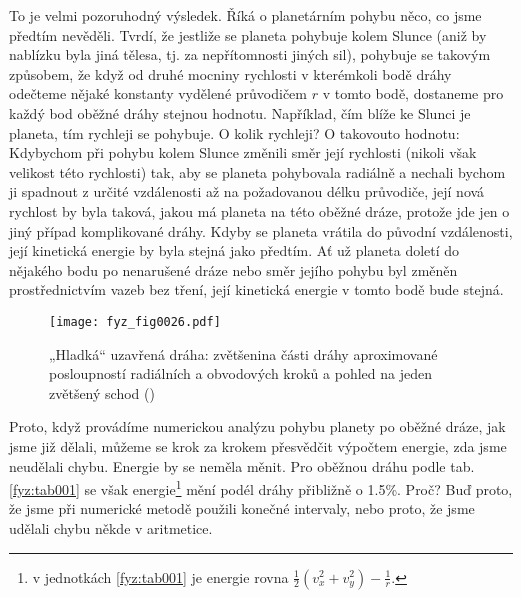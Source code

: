     To je velmi pozoruhodný výsledek. Říká o planetárním pohybu něco, co jsme předtím nevěděli. 
    Tvrdí, že jestliže se planeta pohybuje kolem Slunce (aniž by nablízku byla jiná tělesa, tj. za 
    nepřítomnosti jiných sil), pohybuje se takovým způsobem, že když od druhé mocniny rychlosti v 
    kterémkoli bodě dráhy odečteme nějaké konstanty vydělené průvodičem \(r\) v tomto bodě, 
    dostaneme pro každý bod oběžné dráhy stejnou hodnotu. Například, čím blíže ke Slunci je 
    planeta, tím rychleji se pohybuje. O kolik rychleji? O takovouto hodnotu: Kdybychom při pohybu 
    kolem Slunce změnili směr její rychlosti (nikoli však velikost této rychlosti) tak, aby se 
    planeta pohybovala radiálně a nechali bychom ji spadnout z určité vzdálenosti až na požadovanou 
    délku průvodiče, její nová rychlost by byla taková, jakou má planeta na této oběžné dráze, 
    protože jde jen o jiný případ komplikované dráhy. Kdyby se planeta vrátila do původní 
    vzdálenosti, její kinetická energie by byla stejná jako předtím. Ať už planeta doletí do 
    nějakého bodu po nenarušené dráze nebo směr jejího pohybu byl změněn prostřednictvím vazeb bez 
    tření, její kinetická energie v tomto bodě bude stejná.

    \begin{figure}[ht!]  %
      \centering
      \texttt{[image: fyz\_fig0026.pdf]}
      \caption{„Hladká“ uzavřená dráha: zvětšenina části dráhy aproximované posloupností radiálních 
      a obvodových kroků a pohled na jeden zvětšený schod (\cite[s.~191]{Feynman01})}
      \label{fyz:fig0026}
    \end{figure}
    Proto, když provádíme numerickou analýzu pohybu planety po oběžné dráze, jak jsme již dělali, 
    můžeme se krok za krokem přesvědčit výpočtem energie, zda jsme neudělali chybu. Energie by se 
    neměla měnit. Pro oběžnou dráhu podle tab. \ref{fyz:tab001} se však energie\footnote{v 
    jednotkách \ref{fyz:tab001} je energie rovna \(\frac{1}{2}(v_x^2+v_y^2)-\frac{1}{r}\).} mění 
    podél dráhy přibližně o \num{1.5}\%. Proč? Buď proto, že jsme při numerické metodě použili 
    konečné intervaly, nebo proto, že jsme udělali chybu někde v aritmetice.
    
